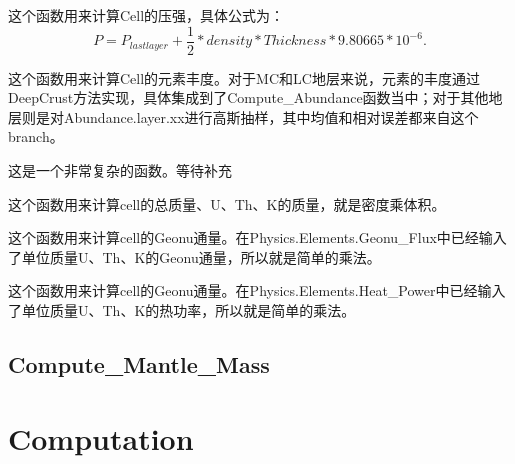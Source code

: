 		\begin{GCBox}[title = Compute\_Layer\_Pressure]{}
			这个函数用来计算Cell的压强，具体公式为：
				\begin{equation}
					P
					= P_{last layer} + \frac{1}{2} * density * Thickness * 9.80665 * 10^{-6}.
				\end{equation}
		\end{GCBox}
		\begin{GCBox}[title = Compute\_Layer\_Abundance]{}
			这个函数用来计算Cell的元素丰度。对于MC和LC地层来说，元素的丰度通过DeepCrust方法实现，具体集成到了Compute\_Abundance函数当中；对于其他地层则是对Abundance.layer.xx进行高斯抽样，其中均值和相对误差都来自这个branch。
		\end{GCBox}
		\begin{BCBox}[title = Compute\_Abundance]{}
			这是一个非常复杂的函数。等待补充
		\end{BCBox}
		\begin{GCBox}[title = Compute\_Layer\_Mass]{}
			这个函数用来计算cell的总质量、U、Th、K的质量，就是密度乘体积。
		\end{GCBox}
		\begin{GCBox}[title = Compute\_Layer\_Geonu\_Flux]{}
			这个函数用来计算cell的Geonu通量。在Physics.Elements.Geonu\_Flux中已经输入了单位质量U、Th、K的Geonu通量，所以就是简单的乘法。
		\end{GCBox}
		\begin{GCBox}[title = Compute\_Layer\_Heat\_Power]{}
			这个函数用来计算cell的Geonu通量。在Physics.Elements.Heat\_Power中已经输入了单位质量U、Th、K的热功率，所以就是简单的乘法。
		\end{GCBox}
	\section{Compute\_Mantle\_Mass}
\chapter{Computation}
